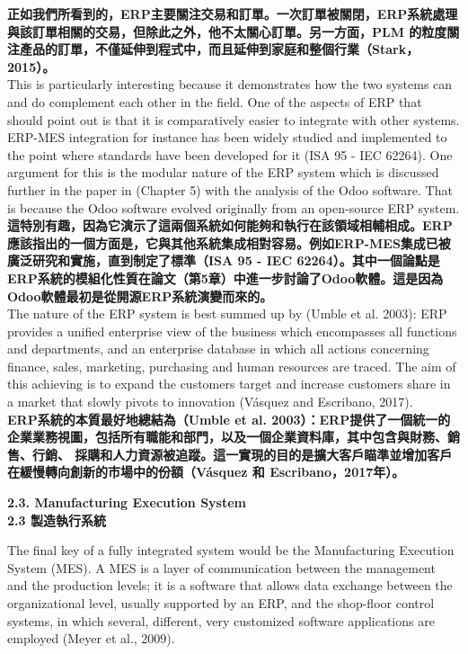 \documentclass[24pt]{article} %
\begin{document}
\textbf{正如我們所看到的，ERP主要關注交易和訂單。一次訂單被關閉，ERP系統處理與該訂單相關的交易，但除此之外，他不太關心訂單。另一方面，PLM 的粒度關注產品的訂單，不僅延伸到程式中，而且延伸到家庭和整個行業（Stark，2015）。}\\

This is particularly interesting because it demonstrates how the two systems can and do complement each other in the field. One of the aspects of ERP that should point out is that it is comparatively easier to integrate with other systems. ERP-MES integration for instance has been widely studied and implemented to the point where standards have been developed for it (ISA 95 - IEC 62264). One argument for this is the modular nature of the ERP system which is discussed further in the paper in (Chapter 5) with the analysis of the Odoo software. That is because the Odoo software evolved originally from an open-source ERP system.\\

\textbf{這特別有趣，因為它演示了這兩個系統如何能夠和執行在該領域相輔相成。ERP應該指出的一個方面是，它與其他系統集成相對容易。例如ERP-MES集成已被廣泛研究和實施，直到制定了標準（ISA 95 - IEC 62264）。其中一個論點是ERP系統的模組化性質在論文（第5章）中進一步討論了Odoo軟體。這是因為Odoo軟體最初是從開源ERP系統演變而來的。}\\

The nature of the ERP system is best summed up by (Umble et al. 2003): ERP provides a unified enterprise view of the business which encompasses all functions and departments, and an enterprise database in which all actions concerning finance, sales, marketing, purchasing and human resources are traced. The aim of this achieving is to expand the customers target and increase customers share in a market that slowly pivots to innovation (Vásquez and Escribano, 2017). \\

\textbf{ERP系統的本質最好地總結為（Umble et al. 2003）：ERP提供了一個統一的企業業務視圖，包括所有職能和部門，以及一個企業資料庫，其中包含與財務、銷售、行銷、 採購和人力資源被追蹤。這一實現的目的是擴大客戶瞄準並增加客戶在緩慢轉向創新的市場中的份額（Vásquez 和 Escribano，2017年）。}\\

\begin{center}
\Large \textbf{2.3.  Manufacturing Execution System}\\

\Large \textbf{2.3 製造執行系統}\\
\end{center}
The final key of a fully integrated system would be the Manufacturing Execution System (MES). A MES is a layer of communication between the management and the production levels; it is a software that allows data exchange between the organizational level, usually supported by an ERP, and the shop-floor control systems, in which several, different, very customized software applications are employed (Meyer et al., 2009).\\
\end{document}
